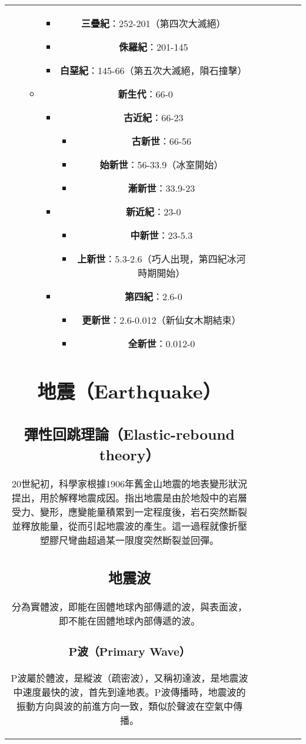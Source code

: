 \documentclass[a4paper,12pt]{report}
\begin{document}
\begin{tabular}{|c|c|c|c|c|c|}
\begin{itemize}
\begin{itemize}
\begin{itemize}
\item \textbf{三疊紀}：252-201（第四次大滅絕）
\item \textbf{侏羅紀}：201-145
\item \textbf{白堊紀}：145-66（第五次大滅絕，隕石撞擊）
\end{itemize}
\item \textbf{新生代}：66-0
\begin{itemize}
\item \textbf{古近紀}：66-23
\begin{itemize}
\item \textbf{古新世}：66-56
\item \textbf{始新世}：56-33.9（冰室開始）
\item \textbf{漸新世}：33.9-23
\end{itemize}
\item \textbf{新近紀}：23-0
\begin{itemize}
\item \textbf{中新世}：23-5.3
\item \textbf{上新世}：5.3-2.6（巧人出現，第四紀冰河時期開始）
\end{itemize}
\item \textbf{第四紀}：2.6-0
\begin{itemize}
\item \textbf{更新世}：2.6-0.012（新仙女木期結束）
\item \textbf{全新世}：0.012-0
\end{itemize}
\end{itemize}
\end{itemize}
\end{itemize}
\section{地震（Earthquake）}
\subsection{彈性回跳理論（Elastic-rebound theory）}
20世紀初，科學家根據1906年舊金山地震的地表變形狀況提出，用於解釋地震成因。指出地震是由於地殼中的岩層受力、變形，應變能量積累到一定程度後，岩石突然斷裂並釋放能量，從而引起地震波的產生。這一過程就像折壓塑膠尺彎曲超過某一限度突然斷裂並回彈。
\subsection{地震波}
分為實體波，即能在固體地球內部傳遞的波，與表面波，即不能在固體地球內部傳遞的波。
\subsubsection{P波（Primary Wave）}
P波屬於體波，是縱波（疏密波），又稱初達波，是地震波中速度最快的波，首先到達地表。P波傳播時，地震波的振動方向與波的前進方向一致，類似於聲波在空氣中傳播。


\end{tabular}
\end{document}
